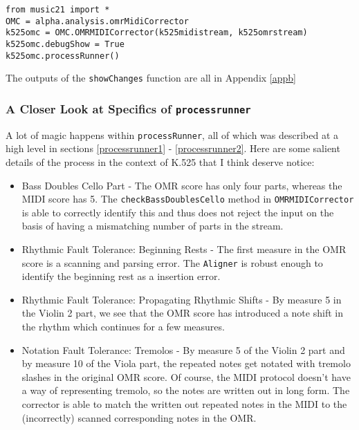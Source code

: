 \begin{verbatim}
from music21 import *
OMC = alpha.analysis.omrMidiCorrector
k525omc = OMC.OMRMIDICorrector(k525midistream, k525omrstream)
k525omc.debugShow = True
k525omc.processRunner()
\end{verbatim}

The outputs of the \texttt{showChanges} function are all in Appendix \ref{appb}

\subsubsection{A Closer Look at Specifics of \texttt{processrunner}}
A lot of magic happens within \texttt{processRunner}, all of which was described at a high level in sections \ref{processrunner1} - \ref{processrunner2}. Here are some salient details of the process in the context of K.525 that I think deserve notice:
\begin{itemize}
\item Bass Doubles Cello Part - The OMR score has only four parts, whereas the MIDI score has 5. The \texttt{checkBassDoublesCello} method in \texttt{OMRMIDICorrector} is able to correctly identify this and thus does not reject the input on the basis of having a mismatching number of parts in the stream. 
\item Rhythmic Fault Tolerance: Beginning Rests - The first measure in the OMR score is a scanning and parsing error. The \texttt{Aligner} is robust enough to identify the beginning rest as a insertion error. 
\item Rhythmic Fault Tolerance: Propagating Rhythmic Shifts - By measure 5 in the Violin 2 part, we see that the OMR score has introduced a  note shift in the rhythm which continues for a few measures. 
\item Notation Fault Tolerance: Tremolos - By measure 5 of the Violin 2 part and by measure 10 of the Viola part, the repeated  notes get notated with tremolo slashes in the original OMR score. Of course, the MIDI protocol doesn't have a way of representing tremolo, so the notes are written out in long form. The corrector is able to match the written out repeated notes in the MIDI to the (incorrectly) scanned corresponding notes in the OMR. 
\end{itemize}


